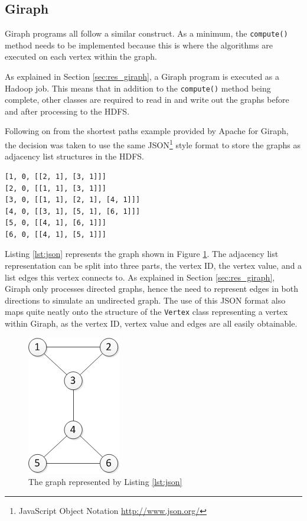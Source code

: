 \subsection{Giraph}
Giraph programs all follow a similar construct. As a minimum, the \verb/compute()/ method needs to be implemented because this is where the algorithms are executed on each vertex within the graph.

As explained in Section \ref{sec:res_giraph}, a Giraph program is executed as a Hadoop job. This means that in addition to the \verb/compute()/ method being complete, other classes are required to read in and write out the graphs before and after processing to the HDFS.

Following on from the shortest paths example \cite{giraphexample} provided by Apache for Giraph, the decision was taken to use the same JSON\footnote{JavaScript Object Notation \url{http://www.json.org/}} style format to store the graphs as adjacency list structures in the HDFS.

\begin{lstlisting}[float]
[1, 0, [[2, 1], [3, 1]]]
[2, 0, [[1, 1], [3, 1]]]
[3, 0, [[1, 1], [2, 1], [4, 1]]]
[4, 0, [[3, 1], [5, 1], [6, 1]]]
[5, 0, [[4, 1], [6, 1]]]
[6, 0, [[4, 1], [5, 1]]]
\end{lstlisting}

Listing \ref{lst:json} represents the graph shown in Figure \ref{fig:json}. The adjacency list representation can be split into three parts, the vertex ID, the vertex value, and a list edges this vertex connects to. As explained in Section \ref{sec:res_giraph}, Giraph only processes directed graphs, hence the need to represent edges in both directions to simulate an undirected graph. The use of this JSON format also maps quite neatly onto the structure of the \verb/Vertex/ class representing a vertex within Giraph, as the vertex ID, vertex value and edges are all easily obtainable.

\begin{figure}[htbp]
  \centering
    \includegraphics{./img/json}
  \caption{The graph represented by Listing \ref{lst:json}}
  \label{fig:json}
\end{figure}

